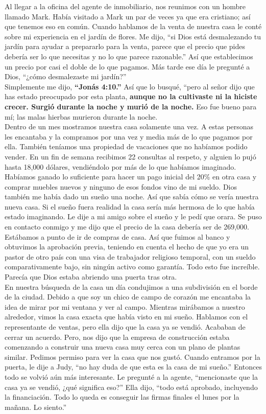 \documentclass[twoside, 12pt]{book}
\begin{document}
Al llegar a la oficina del agente de inmobiliario, nos reunimos con un hombre llamado Mark. Había visitado a Mark un par de veces ya que era cristiano; así que tenemos eso en común. Cuando hablamos de la venta de nuestra casa le conté sobre mi experiencia en el jardín de flores. Me dijo, “si Dios está desmalezando tu jardín para ayudar a prepararlo para la venta, parece que el precio que pides debería ser lo que necesitas y no lo que parece razonable.” Así que establecimos un precio por casi el doble de lo que pagamos. Más tarde ese día le pregunté a Dios, “¿cómo desmalezaste mi jardín?”\\

Simplemente me dijo, \textbf{“Jonás 4:10.”} Así que lo busqué, “pero al señor dijo que has estado preocupado por esta planta, \textbf{aunque no la cultivaste ni la hiciste crecer. Surgió durante la noche y murió de la noche.} Eso fue bueno para mí; las malas hierbas murieron durante la noche.\\

Dentro de un mes mostramos nuestra casa solamente una vez. A estas personas les encantaba y la compramos por una vez y media más de lo que pagamos por ella. También teníamos una propiedad de vacaciones que no habíamos podido vender. En un fin de semana recibimos 22 consultas al respeto, y alguien lo pujó hasta 18,000 dólares, vendiéndolo por más de lo que habíamos imaginado. Habíamos ganado lo suficiente para hacer un pago inicial del 20\% en otra casa y comprar muebles nuevos y ninguno de esos fondos vino de mi sueldo.
Dios también me había dado un sueño una noche. Así que sabía cómo se vería nuestra nueva casa. Si el sueño fuera realidad la casa sería más hermosa de lo que había estado imaginando. Le dije a mi amigo sobre el sueño y le pedí que orara. Se puso en contacto conmigo y me dijo que el precio de la casa debería ser de 269,000. Estábamos a punto de ir de compras de casa. Así que fuimos al banco y obtuvimos la aprobación previa, teniendo en cuenta el hecho de que yo era un pastor de otro país con una visa de trabajador religioso temporal, con un sueldo comparativamente bajo, sin ningún activo como garantía. Todo esto fue increíble. Parecía que Dios estaba abriendo una puerta tras otra.\\

En nuestra búsqueda de la casa un día condujimos a una subdivisión en el borde de la ciudad. Debido a que soy un chico de campo de corazón me encantaba la idea de mirar por mi ventana y ver al campo. Mientras mirábamos a nuestro alrededor, vimos la casa exacta que había visto en mi sueño. Hablamos con el representante de ventas, pero ella dijo que la casa ya se vendió.  Acababan de cerrar un acuerdo. Pero, nos dijo que la empresa de construcción estaba comenzando a construir una nueva casa muy cerca con un plano de plantas similar. Pedimos permiso para ver la casa que nos gustó. Cuando entramos por la puerta, le dije a Judy, “no hay duda de que esta es la casa de mi sueño.” Entonces todo se volvió aún más interesante. Le pregunté a la agente, “mencionaste que la casa ya se vendió, ¿qué significa eso?”  Ella dijo, “todo está aprobado, incluyendo la financiación. Todo lo queda es conseguir las firmas finales el lunes por la mañana. Lo siento.”\\
\end{document}
